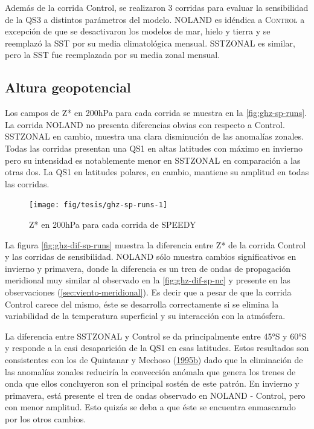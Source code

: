 \documentclass[spanish,a4paper,12pt,oneside]{book}
\begin{document}
Además de la corrida Control, se realizaron 3 corridas para evaluar la
sensibilidad de la QS3 a distintos parámetros del modelo.
\textsc{NOLAND} es idéndica a \textsc{Control} a excepción de que se
desactivaron los modelos de mar, hielo y tierra y se reemplazó la SST
por su media climatológica mensual. \textsc{SSTZONAL} es similar, pero
la SST fue reemplazada por su media zonal mensual.

\subsection{Altura geopotencial}\label{altura-geopotencial-2}

Los campos de Z* en 200hPa para cada corrida se muestra en la
\autoref{fig:ghz-sp-runs}. La corrida NOLAND no presenta diferencias
obvias con respecto a Control. SSTZONAL en cambio, muestra una clara
disminución de las anomalías zonales. Todas las corridas presentan una
QS1 en altas latitudes con máximo en invierno pero su intensidad es
notablemente menor en SSTZONAL en comparación a las otras dos. La QS1 en
latitudes polares, en cambio, mantiene su amplitud en todas las
corridas.

\begin{landscape}\begin{figure}

{\centering \texttt{[image: fig/tesis/ghz-sp-runs-1]} 

}

\caption{Z* en 200hPa para cada corrida de SPEEDY}\label{fig:ghz-sp-runs}
\end{figure}
\end{landscape}

La figura \autoref{fig:ghz-dif-sp-runs} muestra la diferencia entre Z*
de la corrida Control y las corridas de sensibilidad. NOLAND sólo
muestra cambios significativos en invierno y primavera, donde la
diferencia es un tren de ondas de propagación meridional muy similar al
observado en la \autoref{fig:ghz-dif-sp-nc} y presente en las
observaciones (\autoref{sec:viento-meridional}). Es decir que a pesar de
que la corrida Control carece del mismo, éste se desarrolla
correctamente si se elimina la variabilidad de la temperatura
superficial y su interacción con la atmósfera.

La diferencia entre SSTZONAL y Control se da principalmente entre 45°S y
60°S y responde a la casi desaparición de la QS1 en esas latitudes.
Estos resultados son consistentes con los de Quintanar y Mechoso
(\protect\hyperlink{ref-Quintanar1995}{1995}\protect\hyperlink{ref-Quintanar1995}{b})
dado que la eliminación de las anomalías zonales reduciría la convección
anómala que genera los trenes de onda que ellos concluyeron son el
principal sostén de este patrón. En invierno y primavera, está presente
el tren de ondas observado en NOLAND - Control, pero con menor amplitud.
Esto quizás se deba a que éste se encuentra enmascarado por los otros
cambios.
\end{document}
